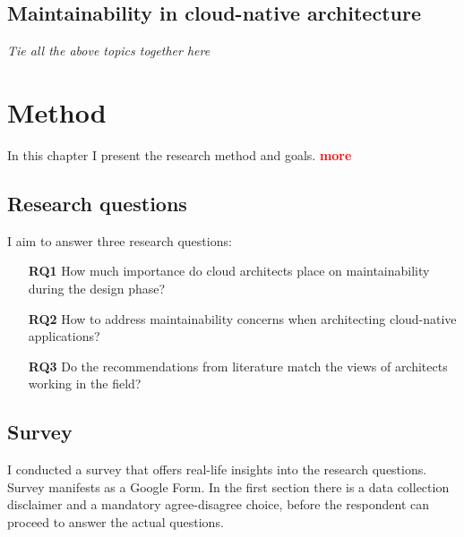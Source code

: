 \documentclass[utf8,english]{gradu3}
\newcommand{\todo}[1]{\textbf{\textcolor{red}{#1}}}
\newcommand{\tmp}[1]{\textit{{#1}}}
\begin{document}
\section{Maintainability in cloud-native architecture}
\tmp{Tie all the above topics together here}

\chapter{Method}

In this chapter I present the research method and goals. \todo{more}

\section{Research questions}

I aim to answer three research questions:
\begin{itemize}
  \item [\textbf{RQ1}] How much importance do cloud architects place on maintainability during
        the design phase?
  \item [\textbf{RQ2}] How to address maintainability concerns when architecting cloud-native
        applications?
  \item [\textbf{RQ3}] Do the recommendations from literature match the views of architects
        working in the field?
\end{itemize}


\section{Survey}

I conducted a survey that offers real-life insights into the research questions.
Survey manifests as a Google Form.
In the first section there is a data collection disclaimer and a mandatory agree-disagree choice,
before the respondent can proceed to answer the actual questions.
\end{document}
